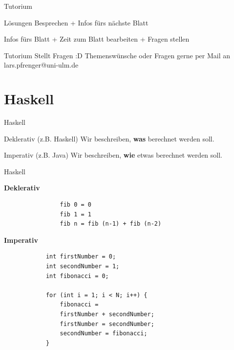 \documentclass[
	aspectratio=169, 
	10pt 
]{beamer}
\begin{document}
\begin{frame}{Tutorium}
	\begin{description}[Woche A:]
		\item[\textbf{Woche A}:] Lösungen Besprechen + Infos fürs nächste Blatt
		\item[\textbf{Woche B}:] Infos fürs Blatt + Zeit zum Blatt bearbeiten + Fragen stellen
	\end{description}
\end{frame}

\begin{frame}{Tutorium}
	\center Stellt Fragen :D
	\center Themenswünsche oder Fragen gerne per Mail an lars.pfrenger@uni-ulm.de
\end{frame}

\section{Haskell}
\begin{frame}{Haskell}
	\begin{fancycolumns}
		\begin{info}{Deklerativ (z.B. Haskell)}
			Wir beschreiben, \textbf{was} berechnet werden soll.
		\end{info}
		\nextcolumn
		\begin{info}{Imperativ (z.B. Java)}
			Wir beschreiben, \textbf{wie} etwas berechnet werden soll.
		\end{info}
	\end{fancycolumns}
\end{frame}

\begin{frame}[fragile]{Haskell}
	\begin{fancycolumns}[T,widths={50,50}]
		\textbf{Deklerativ}\break\mbox{}\newline
		\begin{minipage}{0.5\textwidth}
			\begin{verbatim}
				fib 0 = 0
				fib 1 = 1
				fib n = fib (n-1) + fib (n-2)
			\end{verbatim}
		\end{minipage}
		\nextcolumn	
		\textbf{Imperativ}\break\mbox{}\newline
	\begin{minipage}{0.5\textwidth}
		\begin{verbatim}
			int firstNumber = 0;
			int secondNumber = 1;
			int fibonacci = 0;

			for (int i = 1; i < N; i++) {
				fibonacci = 
				firstNumber + secondNumber;
				firstNumber = secondNumber;
				secondNumber = fibonacci;
			}
		\end{verbatim}
	\end{minipage}
	\end{fancycolumns}
\end{frame}
\end{document}
